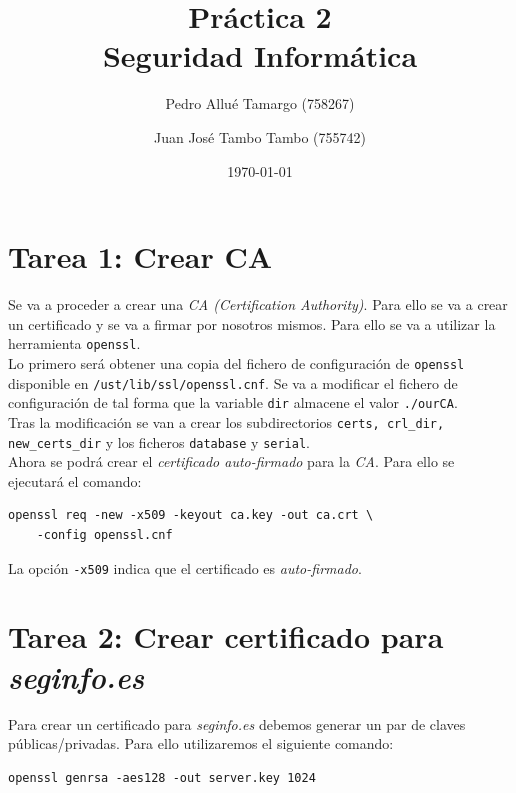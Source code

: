 \documentclass[10pt,a4paper]{article}
\begin{document}
\begin{titlepage}
\title{\textbf{\Huge{Práctica 2}\\
	\large{Seguridad Informática}
}}
\author{
	Pedro Allué Tamargo (758267)
	\and
	Juan José Tambo Tambo (755742)
}
\date{\today}
\clearpage\maketitle
\thispagestyle{empty}
\tableofcontents
\end{titlepage}

\section{Tarea 1: Crear CA}

Se va a proceder a crear una \emph{CA (Certification Authority)}. Para ello se va a crear un certificado y se va a firmar por nosotros mismos. Para ello se va a utilizar la herramienta \texttt{openssl}.\\
Lo primero será obtener una copia del fichero de configuración de \texttt{openssl} disponible en \texttt{/ust/lib/ssl/openssl.cnf}. Se va a modificar el fichero de configuración de tal forma que la variable \texttt{dir} almacene el valor \texttt{./ourCA}.\\
Tras la modificación se van a crear los subdirectorios \texttt{certs, crl\_{}dir, new\_{}certs\_{}dir} y los ficheros \texttt{database} y \texttt{serial}.\\

Ahora se podrá crear el \emph{certificado auto-firmado} para la \emph{CA}. Para ello se ejecutará el comando:

\begin{lstlisting}
openssl req -new -x509 -keyout ca.key -out ca.crt \
	-config openssl.cnf
\end{lstlisting}

La opción \texttt{-x509} indica que el certificado es \emph{auto-firmado}.


\section{Tarea 2: Crear certificado para \emph{seginfo.es}}

Para crear un certificado para \emph{seginfo.es} debemos generar un par de claves públicas/privadas. Para ello utilizaremos el siguiente comando:

\begin{lstlisting}
openssl genrsa -aes128 -out server.key 1024
\end{lstlisting}
\end{document}
